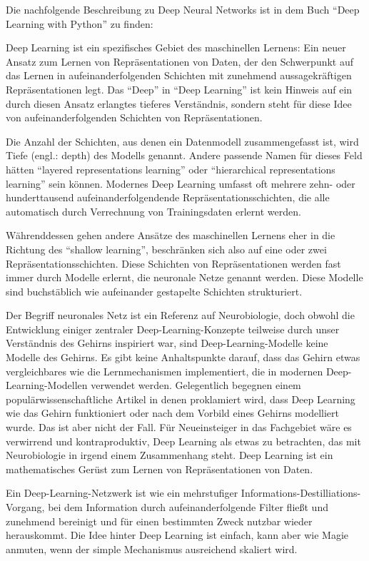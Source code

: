 Die nachfolgende Beschreibung zu Deep Neural Networks ist in dem Buch ``Deep Learning with Python'' \cite{chollet2021deep} zu finden:

Deep Learning ist ein spezifisches Gebiet des maschinellen Lernens: Ein neuer Ansatz zum Lernen von Repräsentationen von Daten, der den Schwerpunkt auf das Lernen in aufeinanderfolgenden Schichten mit zunehmend aussagekräftigen Repräsentationen legt. Das ``Deep'' in ``Deep Learning'' ist kein Hinweis auf ein durch diesen Ansatz erlangtes tieferes Verständnis, sondern steht für diese Idee von aufeinanderfolgenden Schichten von Repräsentationen.

Die Anzahl der Schichten, aus denen ein Datenmodell zusammengefasst ist, wird Tiefe (engl.: depth) des Modells genannt. Andere passende Namen für dieses Feld hätten ``layered representations learning'' oder ``hierarchical representations learning'' sein können. Modernes Deep Learning umfasst oft mehrere zehn- oder hunderttausend aufeinanderfolgendende Repräsentationsschichten, die alle automatisch durch Verrechnung von Trainingsdaten erlernt werden.

Währenddessen gehen andere Ansätze des maschinellen Lernens eher in die Richtung des ``shallow learning'', beschränken sich also auf eine oder zwei Repräsentationsschichten. Diese Schichten von Repräsentationen werden fast immer durch Modelle erlernt, die neuronale Netze genannt werden. Diese Modelle sind buchstäblich wie aufeinander gestapelte Schichten strukturiert.

Der Begriff neuronales Netz ist ein Referenz auf Neurobiologie, doch obwohl die Entwicklung einiger zentraler Deep-Learning-Konzepte teilweise durch unser Verständnis des Gehirns inspiriert war, sind Deep-Learning-Modelle keine Modelle des Gehirns. Es gibt keine Anhaltspunkte darauf, dass das Gehirn etwas vergleichbares wie die Lernmechanismen implementiert, die in modernen Deep-Learning-Modellen verwendet werden. Gelegentlich begegnen einem populärwissenschaftliche Artikel in denen proklamiert wird, dass Deep Learning wie das Gehirn funktioniert oder nach dem Vorbild eines Gehirns modelliert wurde. Das ist aber nicht der Fall. Für Neueinsteiger in das Fachgebiet wäre es verwirrend und kontraproduktiv, Deep Learning als etwas zu betrachten, das mit Neurobiologie in irgend einem Zusammenhang steht. Deep Learning ist ein mathematisches Gerüst zum Lernen von Repräsentationen von Daten.

Ein Deep-Learning-Netzwerk ist wie ein mehrstufiger Informations-Destilliations-Vorgang, bei dem Information durch aufeinanderfolgende Filter fließt und zunehmend bereinigt und für einen bestimmten Zweck nutzbar wieder herauskommt. Die Idee hinter Deep Learning ist einfach, kann aber wie Magie anmuten, wenn der simple Mechanismus ausreichend skaliert wird.
\cite{chollet2021deep}

